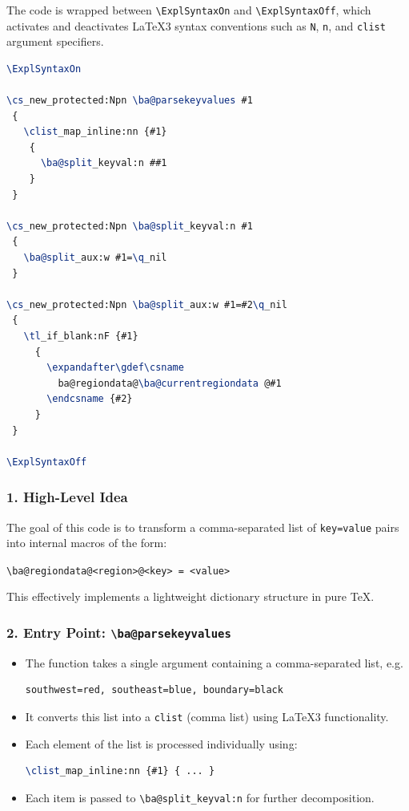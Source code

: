 The code is wrapped between \verb|\ExplSyntaxOn| and \verb|\ExplSyntaxOff|, which activates and deactivates \LaTeX3 syntax conventions such as \texttt{N}, \texttt{n}, and \texttt{clist} argument specifiers.

\begin{lstlisting}[language=LaTeX]
\ExplSyntaxOn

\cs_new_protected:Npn \ba@parsekeyvalues #1
 {
   \clist_map_inline:nn {#1}
    {
      \ba@split_keyval:n ##1
    }
 }

\cs_new_protected:Npn \ba@split_keyval:n #1
 {
   \ba@split_aux:w #1=\q_nil
 }

\cs_new_protected:Npn \ba@split_aux:w #1=#2\q_nil
 {
   \tl_if_blank:nF {#1}
     {
       \expandafter\gdef\csname
         ba@regiondata@\ba@currentregiondata @#1
       \endcsname {#2}
     }
 }

\ExplSyntaxOff
\end{lstlisting}

\subsubsection*{1. High-Level Idea}

The goal of this code is to transform a comma-separated list of \texttt{key=value} pairs into internal macros of the form:

\begin{center}
\texttt{\textbackslash ba@regiondata@<region>@<key> = <value>}
\end{center}

This effectively implements a lightweight dictionary structure in pure TeX.

\subsubsection*{2. Entry Point: \texttt{\textbackslash ba@parsekeyvalues}}

\begin{itemize}
\item The function takes a single argument containing a comma-separated list, e.g.
\begin{lstlisting}[language=LaTeX]
southwest=red, southeast=blue, boundary=black
\end{lstlisting}

\item It converts this list into a \texttt{clist} (comma list) using \LaTeX3 functionality.

\item Each element of the list is processed individually using:
\begin{lstlisting}[language=LaTeX]
\clist_map_inline:nn {#1} { ... }
\end{lstlisting}

\item Each item is passed to \lstinline|\ba@split_keyval:n| for further decomposition.
\end{itemize}


